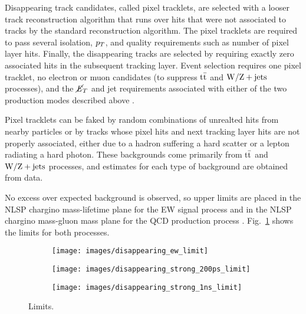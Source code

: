 \documentclass[12pt]{article}
\begin{document}
        Disappearing track candidates, called pixel tracklets, are selected with a looser track reconstruction algorithm that runs over hits that were not associated to tracks by the standard reconstruction algorithm. The pixel tracklets are required to pass several isolation, $p_T$, and quality requirements such as number of pixel layer hits. Finally, the disappearing tracks are selected by requiring exactly zero associated hits in the subsequent tracking layer. Event selection requires one pixel tracklet, no electron or muon candidates (to suppress $\mathrm{t}\bar{\mathrm{t}}$ and $\mathrm{W}/\mathrm{Z} + \mathrm{jets}$ processes), and the $\cancel{\it{E}}_{T}$ and jet requirements associated with either of the two production modes described above .
        
        Pixel tracklets can be faked by random combinations of unrealted hits from nearby particles or by tracks whose pixel hits and next tracking layer hits are not properly associated, either due to a hadron suffering a hard scatter or a lepton radiating a hard photon. These backgrounds come primarily from $\mathrm{t}\bar{\mathrm{t}}$ and $\mathrm{W}/\mathrm{Z} + \mathrm{jets}$ processes, and estimates for each type of background are obtained from data. 

        No excess over expected background is observed, so upper limits are placed in the NLSP chargino mass-lifetime plane for the EW signal process and in the NLSP chargino mass-gluon mass plane for the QCD production process . Fig.~\ref{disappearing_limits} shows the limits for both processes.

        \noindent \begin{figure}[htbp] \begin{center}
        \begin{subfigure}[htbp]{0.3\textwidth} \begin{center}
        \texttt{[image: images/disappearing\_ew\_limit]}
        \end{center} \end{subfigure}
        \begin{subfigure}[htbp]{0.3\textwidth} \begin{center}
        \texttt{[image: images/disappearing\_strong\_200ps\_limit]}
        \end{center} \end{subfigure}
        \begin{subfigure}[htbp]{0.3\textwidth} \begin{center}
        \texttt{[image: images/disappearing\_strong\_1ns\_limit]}
        \end{center} \end{subfigure}
        \caption{Limits.}
        \label{disappearing_limits}
        \end{center} \end{figure}
\end{document}
